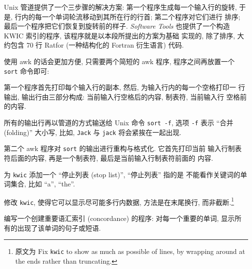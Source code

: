 Unix 管道提供了一个三步骤的解决方案: 第一个程序生成每一个输入行的旋转,
于是, 行内的每一个单词轮流移动到其所在行的行首; 第二个程序对它们进行
排序; 最后一个程序把它们恢复到旋转前的样子. \textit{Software Tools}
也提供了一个构造 KWIC 索引的程序, 该程序就是以本段所提出的方案为基础
实现的, 除了排序, 大约包含 70 行 Ratfor (一种结构化的 Fortran 衍生语言)
代码.

使用 awk 的话会更加方便, 只需要两个简短的 awk 程序, 程序之间再放置一个
\texttt{sort} 命令即可:
第一个程序首先打印每个输入行的副本, 然后, 为输入行内的每一个空格打印一
行输出, 输出行由三部分构成: 当前输入行空格后的内容, 制表符, 当前输入行%
%
空格前的内容.

所有的输出行再以管道的方式输送给 Unix 命令 \texttt{sort -f}, 选项
\texttt{-f} 表示 ``合并 (folding)'' 大小写, 比如, \texttt{Jack} 与 
\texttt{jack} 将会紧挨在一起出现.

第二个 awk 程序对 \texttt{sort} 的输出进行重构与格式化. 它首先打印当前
输入行制表符后面的内容, 再是一个制表符, 最后是当前输入行制表符前面的
内容.

\begin{exercise}
    为 \texttt{kwic} 添加一个 ``停止列表 (stop list)'', ``停止列表'' 指的是 
    不能看作关键词的单词集合, 比如 ``a'', ``the''.
\end{exercise}

\begin{exercise}
    修改 \texttt{kwic}, 使得它可以显示尽可能多行内数据, 方法是在末尾换行,
    而非截断.\footnote{原文为 Fix \texttt{kwic} to show as much as possible
    of lines, by wrapping around at the ends rather than truncating.}
\end{exercise}

\begin{exercise}
    编写一个创建重要语汇索引 (concordance) 的程序: 对每一个重要的单词,
    显示所有的出现了该单词的句子或短语.
\end{exercise}

